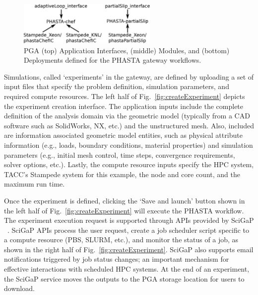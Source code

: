 \begin{figure} \centering
  \includegraphics[width=0.6\textwidth]{figures/phastaGatewayOrg.eps}
  \caption{
    PGA (top) Application Interfaces, (middle) Modules, and (bottom) Deployments defined for
    the PHASTA gateway workflows.
  }
  \label{fig:phastaGatewayOrg}
\end{figure}

Simulations, called ‘experiments’ in the gateway, are defined by uploading a set
of input files that specify the problem definition, simulation parameters, and
required compute resources.
The left half of Fig.~\ref{fig:createExperiment} depicts the experiment
creation interface.
The application inputs include the complete definition of the analysis
domain via the geometric model (typically from a CAD software such as
SolidWorks, NX, etc.) and the unstructured mesh.
Also, included are information associated geometric model entities, such as
physical attribute information (e.g., loads, boundary conditions, material
properties) and simulation parameters (e.g., initial mesh control, time steps,
convergence requirements, solver options, etc.).
Lastly, the compute resource inputs specify the HPC system, TACC’s Stampede
system for this example, the node and core count, and the maximum run time.

Once the experiment is defined, clicking the ‘Save and launch’ button shown in
the left half of Fig.~\ref{fig:createExperiment} will execute the PHASTA workflow.
The experiment execution request is supported through APIs provided by SciGaP
~\cite{scigap2014}.
SciGaP APIs process the user request, create a job scheduler script specific to
a compute resource (PBS, SLURM, etc.), and monitor the status of a job, as shown
in the right half of Fig.~\ref{fig:createExperiment}.
SciGaP also supports email notifications triggered by job status changes; an
important mechanism for effective interactions with scheduled HPC systems.
At the end of an experiment, the SciGaP service moves the outputs to the PGA
storage location for users to download.


